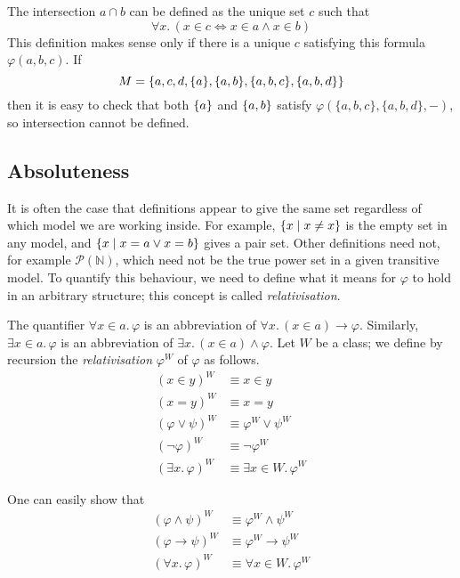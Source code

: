 \begin{example}
    The intersection \( a \cap b \) can be defined as the unique set \( c \) such that
    \[ \forall x.\, (x \in c \iff x \in a \wedge x \in b) \]
    This definition makes sense only if there is a unique \( c \) satisfying this formula \( \varphi(a, b, c) \).
    If
    \[ M = \qty{a, c, d, \qty{a}, \qty{a, b}, \qty{a, b, c}, \qty{a, b, d}} \]
    then it is easy to check that both \( \qty{a} \) and \( \qty{a, b} \) satisfy \( \varphi(\{ a, b, c \}, \{ a, b, d \}, -) \), so intersection cannot be defined.
\end{example}

\subsection{Absoluteness}
It is often the case that definitions appear to give the same set regardless of which model we are working inside.
For example, \( \qty{x \mid x \neq x} \) is the empty set in any model, and \( \qty{x \mid x = a \vee x = b} \) gives a pair set.
Other definitions need not, for example \( \mathcal P(\mathbb N) \), which need not be the true power set in a given transitive model.
To quantify this behaviour, we need to define what it means for \( \varphi \) to hold in an arbitrary structure; this concept is called \emph{relativisation}.
\begin{definition}
    The quantifier \( \forall x \in a.\, \varphi \) is an abbreviation of \( \forall x.\, (x \in a) \to \varphi \).
    Similarly, \( \exists x \in a.\, \varphi \) is an abbreviation of \( \exists x.\, (x \in a) \wedge \varphi \).
    Let \( W \) be a class; we define by recursion the \emph{relativisation} \( \varphi^W \) of \( \varphi \) as follows.
    \begin{align*}
        (x \in y)^W &\equiv x \in y \\
        (x = y)^W &\equiv x = y \\
        (\varphi \vee \psi)^W &\equiv \varphi^W \vee \psi^W \\
        (\neg \varphi)^W &\equiv \neg \varphi^W \\
        (\exists x.\, \varphi)^W &\equiv \exists x \in W.\, \varphi^W
    \end{align*}
\end{definition}
One can easily show that
\begin{align*}
    (\varphi \wedge \psi)^W &\equiv \varphi^W \wedge \psi^W \\
    (\varphi \to \psi)^W &\equiv \varphi^W \to \psi^W \\
    (\forall x.\, \varphi)^W &\equiv \forall x \in W.\, \varphi^W
\end{align*}

